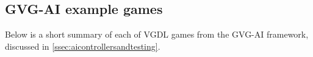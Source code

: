 \documentclass[a4paper,titlepage,final]{report}
\begin{document}
\begin{appendices}



\chapter{GVG-AI example games}
\label{app_gvgaigames}
Below is a short summary of each of VGDL games from the GVG-AI framework, discussed in \ref{ssec:aicontrollersandtesting}.


\end{appendices}
\end{document}
